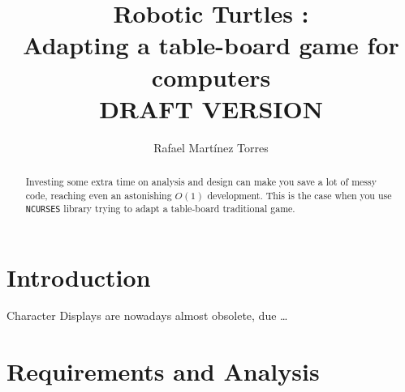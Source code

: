 \documentclass[a4paper,twoside,draft]{article}
\title{
  Robotic Turtles \version :\\
  Adapting a table-board game
  for computers \\
  {\tiny DRAFT VERSION}
}
\author{Rafael Mart\'inez Torres}
\newcommand{\ncurses}{\texttt{NCURSES}\xspace}
\begin{document}
\maketitle{}
\begin{abstract}
  Investing some extra time on analysis and design can make you save a
  lot of messy code, reaching even an astonishing \(O(1)\)
  development. This is the case when you use \ncurses library trying
  to adapt a table-board traditional game.
\end{abstract}

\section{Introduction}
\label{sec:intro}

Character Displays\cite{rockkind} are nowadays almost obsolete, due
\dots

\section{Requirements and Analysis}
\label{sec:anal}
\end{document}
